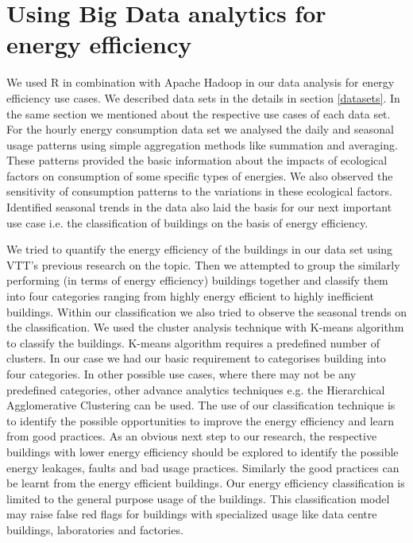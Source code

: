 \section{Using Big Data analytics for energy efficiency}
We used R in combination with Apache Hadoop in our data analysis for energy efficiency use cases. We described data sets in the details in section \ref{datasets}. In the same section we mentioned about the respective use cases of each data set.  For the hourly energy consumption data set we analysed the daily and seasonal usage patterns using simple aggregation methods like summation and averaging. These patterns provided the basic information about the impacts of ecological factors on consumption of some specific types of energies. We also observed the sensitivity of consumption patterns to the variations in these ecological factors. Identified seasonal trends in the data also laid the basis for our next important use case i.e. the classification of buildings on the basis of energy efficiency. 

We tried to quantify the energy efficiency of the buildings in our data set using VTT's previous research on the topic. Then we attempted to group the similarly performing (in terms of energy efficiency) buildings together and classify them into four categories ranging from highly energy efficient to highly inefficient buildings. Within our classification we also tried to observe the seasonal trends on the classification. We used the cluster analysis technique with K-means algorithm to classify the buildings. K-means algorithm requires a predefined number of clusters. In our case we had our basic requirement to categorises building into four categories. In other possible use cases, where there may not be any predefined categories, other advance analytics techniques e.g. the Hierarchical Agglomerative Clustering can be used. The use of our classification technique is to identify the possible opportunities to improve the energy efficiency and learn from good practices. As an obvious next step to our research, the respective buildings with lower energy efficiency should be explored to identify the possible energy leakages, faults and bad usage practices. Similarly the good practices can be learnt from the energy efficient buildings. Our energy efficiency classification is limited to the general purpose usage of the buildings. This classification model may raise false red flags for buildings with specialized usage like data centre buildings, laboratories and factories. 


